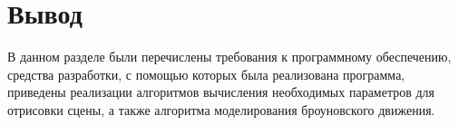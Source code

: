 \clearpage

\section*{Вывод}
В данном разделе были перечислены требования к программному обеспечению, средства разработки, с помощью которых была реализована программа, приведены реализации алгоритмов вычисления необходимых параметров для отрисовки сцены, а также алгоритма моделирования броуновского движения.


